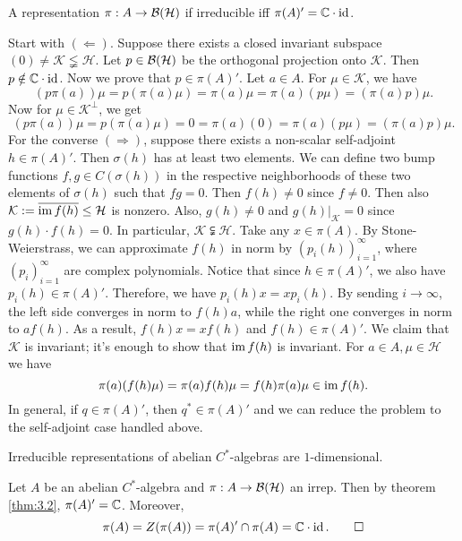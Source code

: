 \begin{theorem}\label{thm:3.2}
  A representation $\pi: A \to \operatorname{\mathcal{B} (\mathcal{H})}$ if irreducible iff $\pi(A)' = \mathbb {C} \cdot \operatorname{id}$.
\end{theorem}

\begin{myproof}
  Start with $(\Leftarrow)$. Suppose there exists a closed invariant subspace $(0) \neq \mathcal{K} \lneqq \mathcal{H}$.
  Let $p \in \operatorname{\mathcal{B} (\mathcal{H})}$ be the orthogonal projection onto $\mathcal{K}$.
  Then $p \notin \mathbb {C} \cdot \operatorname{id}$. Now we prove that $p \in \pi(A)'$.
  Let $a \in A$. For $\mu \in \mathcal{K}$, we have 
  $$(p \pi(a)) \mu = p(\pi(a) \mu) = \pi(a) \mu = \pi(a) (p \mu) = (\pi (a) p) \mu.$$
  Now for $\mu \in \mathcal{K}^\perp$, we get 
  $$(p \pi(a)) \mu = p(\pi(a) \mu) = 0 = \pi(a) (0) = \pi(a) (p \mu) = (\pi(a) p) \mu.$$
  For the converse $(\Rightarrow)$, suppose there exists a non-scalar self-adjoint $h \in \pi(A)'$.
  Then $\sigma(h)$ has at least two elements. We can define two bump functions $f, g \in C(\sigma(h))$ in the respective neighborhoods of these two elements of $\sigma(h)$
  such that $fg = 0$. Then $f(h) \neq 0$ since $f \neq 0$.
  Then also $\mathcal{K} := \overline{\operatorname{im} f(h)} \leq \mathcal{H}$ is nonzero.
  Also, $g(h) \neq 0$ and $g(h)\big|_{\mathcal{K}} = 0$ since $g(h) \cdot f(h) = 0$.
  In particular, $\mathcal{K} \subsetneqq \mathcal{H}$. 
  Take any $x \in \pi (A)$. By Stone-Weierstrass, we can approximate $f(h)$ in norm by $(p_i (h))_{i = 1} ^\infty$, where $(p_i)_{i = 1} ^\infty$ are complex polynomials.
  Notice that since $h \in \pi(A)'$, we also have $p_i (h) \in \pi(A)'$. Therefore, we have $p_i (h) x = x p_i (h)$.
  By sending $i \to \infty$, the left side converges in norm to $f(h) a$, while the right one converges in norm to $a f(h)$.
  As a result, $f(h) x = x f(h)$ and $f(h) \in \pi(A)'$.
  We claim that $\mathcal{K}$ is invariant; it's enough to show that $\operatorname{im} f(h)$ is invariant.
  For $a \in A, \mu \in \mathcal{H}$ we have  
  $$\pi (a) (f(h) \mu) = \pi(a) f(h) \mu = f(h) \pi(a) \mu \in \operatorname{im} f(h).$$
  In general, if $q \in \pi(A)'$, then $q^* \in \pi(A)'$ and we can reduce the problem to the self-adjoint case handled above.
\end{myproof}

\begin{corollary}
  Irreducible representations of abelian $C^*$-algebras are $1$-dimensional.
\end{corollary}

\begin{myproof}
  Let $A$ be an abelian $C^*$-algebra and $\pi: A \to \operatorname{\mathcal{B} (\mathcal{H})}$ an irrep.
  Then by theorem \ref{thm:3.2}, $\pi(A)' = \mathbb {C}$. Moreover,
  \begin{equation*}
    \pi(A) = Z(\pi(A)) = \pi(A)' \cap \pi(A) = \mathbb {C} \cdot \operatorname{id}.\qedhere
  \end{equation*}
\end{myproof}

